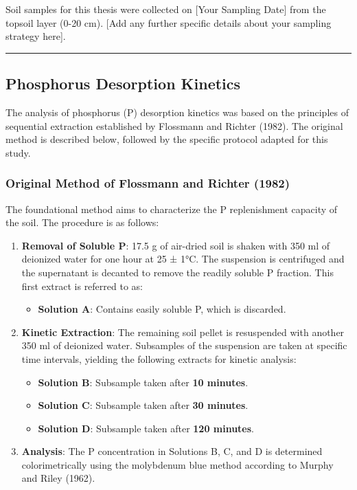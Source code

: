 \documentclass[
  letterpaper,
  DIV=11,
  numbers=noendperiod]{scrartcl}
\providecommand{\tightlist}{%
  \setlength{\itemsep}{0pt}\setlength{\parskip}{0pt}}\usepackage{longtable,booktabs,array}
\begin{document}
Soil samples for this thesis were collected on {[}Your Sampling Date{]}
from the topsoil layer (0-20 cm). {[}Add any further specific details
about your sampling strategy here{]}.

\begin{center}\rule{0.5\linewidth}{0.5pt}\end{center}

\subsection{Phosphorus Desorption
Kinetics}\label{phosphorus-desorption-kinetics}

The analysis of phosphorus (P) desorption kinetics was based on the
principles of sequential extraction established by Flossmann and Richter
(1982). The original method is described below, followed by the specific
protocol adapted for this study.

\subsubsection{Original Method of Flossmann and Richter
(1982)}\label{original-method-of-flossmann-and-richter-1982}

The foundational method aims to characterize the P replenishment
capacity of the soil. The procedure is as follows:

\begin{enumerate}
\def\labelenumi{\arabic{enumi}.}
\tightlist
\item
  \textbf{Removal of Soluble P}: 17.5 g of air-dried soil is shaken with
  350 ml of deionized water for one hour at 25 ± 1°C. The suspension is
  centrifuged and the supernatant is decanted to remove the readily
  soluble P fraction. This first extract is referred to as:

  \begin{itemize}
  \tightlist
  \item
    \textbf{Solution A}: Contains easily soluble P, which is discarded.
  \end{itemize}
\item
  \textbf{Kinetic Extraction}: The remaining soil pellet is resuspended
  with another 350 ml of deionized water. Subsamples of the suspension
  are taken at specific time intervals, yielding the following extracts
  for kinetic analysis:

  \begin{itemize}
  \tightlist
  \item
    \textbf{Solution B}: Subsample taken after \textbf{10 minutes}.
  \item
    \textbf{Solution C}: Subsample taken after \textbf{30 minutes}.
  \item
    \textbf{Solution D}: Subsample taken after \textbf{120 minutes}.
  \end{itemize}
\item
  \textbf{Analysis}: The P concentration in Solutions B, C, and D is
  determined colorimetrically using the molybdenum blue method according
  to Murphy and Riley (1962).
\end{enumerate}
\end{document}
